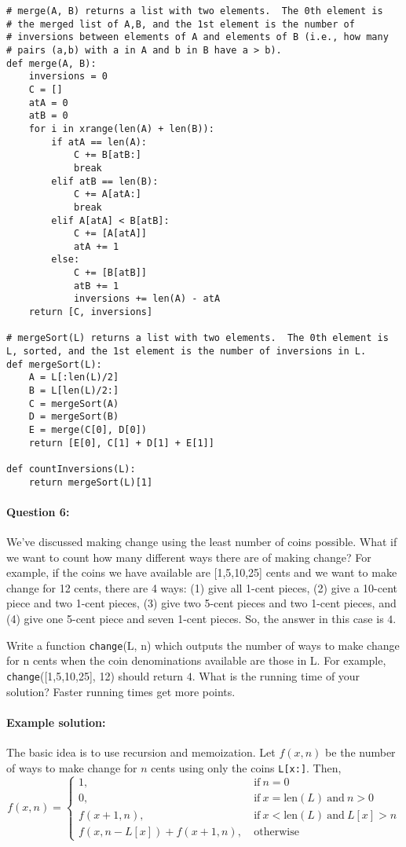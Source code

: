 \documentclass[11pt]{article}
\begin{document}
\begin{verbatim}
# merge(A, B) returns a list with two elements.  The 0th element is
# the merged list of A,B, and the 1st element is the number of
# inversions between elements of A and elements of B (i.e., how many
# pairs (a,b) with a in A and b in B have a > b).
def merge(A, B):
    inversions = 0
    C = []
    atA = 0
    atB = 0
    for i in xrange(len(A) + len(B)):
        if atA == len(A):
            C += B[atB:]
            break
        elif atB == len(B):
            C += A[atA:]
            break
        elif A[atA] < B[atB]:
            C += [A[atA]]
            atA += 1
        else:
            C += [B[atB]]
            atB += 1
            inversions += len(A) - atA
    return [C, inversions]

# mergeSort(L) returns a list with two elements.  The 0th element is
L, sorted, and the 1st element is the number of inversions in L.
def mergeSort(L):
    A = L[:len(L)/2]
    B = L[len(L)/2:]
    C = mergeSort(A)
    D = mergeSort(B)
    E = merge(C[0], D[0])
    return [E[0], C[1] + D[1] + E[1]]

def countInversions(L):
    return mergeSort(L)[1]
\end{verbatim}

\paragraph{Question 6:}
We've discussed making change using the least number of coins
possible.  What if we want to count how many different ways there are
of making change?  For example, if the coins we have available are
[1,5,10,25] cents and we want to make change for 12 cents, there are 4
ways: (1) give all 1-cent pieces, (2) give a 10-cent piece and two
1-cent pieces, (3) give two 5-cent pieces and two 1-cent pieces, and
(4) give one 5-cent piece and seven 1-cent pieces.  So, the answer in
this case is $4$.

Write a function \texttt{change}(L, n) which outputs the number of
ways to make change for n cents when the coin denominations available
are those in L.  For example, \texttt{change}([1,5,10,25], 12) should
return $4$.  What is the running time of your solution?  Faster
running times get more points.

\paragraph{Example solution:}
The basic idea is to use recursion and memoization.  Let $f(x, n)$ be
the number of ways to make change for $n$ cents using only the coins
\texttt{L[x:]}.  Then,
$$
f(x, n) = \begin{cases} 1, \ &
  \mathrm{if}\ n=0
\\ 0, \
&\mathrm{if}\ x=\mathrm{len}(L)\ \mathrm{and}\ n>0 
\\ f(x+1, n), \ &\mathrm{if}\ x<\mathrm{len}(L)\ \mathrm{and}\ L[x]>n
\\ f(x, n - L[x]) + f(x+1, n),\ &\mathrm{otherwise}
\end{cases}
$$
\end{document}
